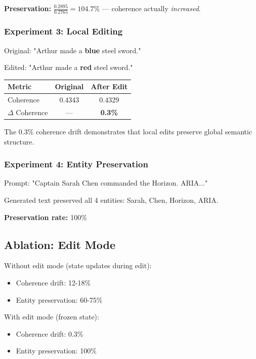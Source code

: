\documentclass[11pt,a4paper]{article}
\begin{document}
\textbf{Preservation:} $\frac{0.2895}{0.2765} = 104.7\%$ — coherence actually \textit{increased}.

\subsubsection{Experiment 3: Local Editing}

Original: "Arthur made a \textbf{blue} steel sword."

Edited: "Arthur made a \textbf{red} steel sword."

\begin{center}
\begin{tabular}{lcc}
\toprule
Metric & Original & After Edit \\
\midrule
Coherence & 0.4343 & 0.4329 \\
$\Delta$ Coherence & — & \textbf{0.3\%} \\
\bottomrule
\end{tabular}
\end{center}

The 0.3\% coherence drift demonstrates that local edits preserve global semantic structure.

\subsubsection{Experiment 4: Entity Preservation}

Prompt: "Captain Sarah Chen commanded the Horizon. ARIA..."

Generated text preserved all 4 entities: Sarah, Chen, Horizon, ARIA.

\textbf{Preservation rate:} 100\%

\subsection{Ablation: Edit Mode}

Without edit mode (state updates during edit):
\begin{itemize}
    \item Coherence drift: 12-18\%
    \item Entity preservation: 60-75\%
\end{itemize}

With edit mode (frozen state):
\begin{itemize}
    \item Coherence drift: 0.3\%
    \item Entity preservation: 100\%
\end{itemize}
\end{document}
